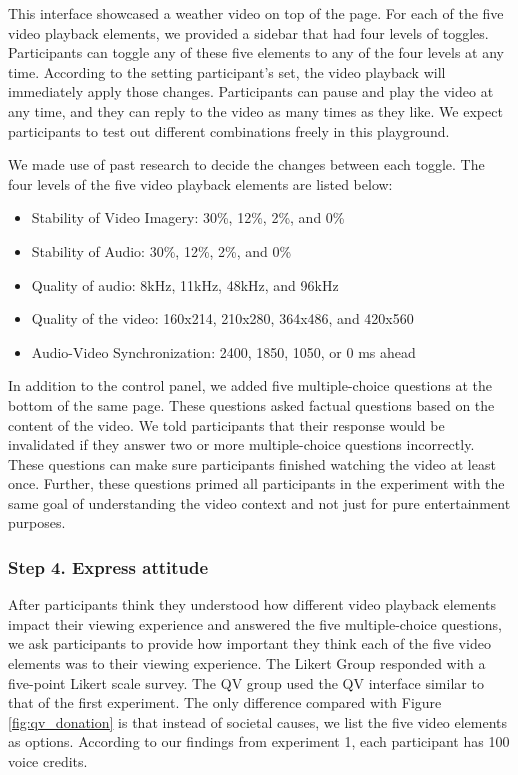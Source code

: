 This interface showcased a weather video on top of the page. For each of the five video playback elements, we provided a sidebar that had four levels of toggles. Participants can toggle any of these five elements to any of the four levels at any time. According to the setting participant's set, the video playback will immediately apply those changes. Participants can pause and play the video at any time, and they can reply to the video as many times as they like. We expect participants to test out different combinations freely in this playground.

We made use of past research to decide the changes between each toggle. The four levels of the five video playback elements are listed below:
\begin{itemize}
    \item Stability of Video Imagery: 30\%, 12\%, 2\%, and 0\%
    \item Stability of Audio: 30\%, 12\%, 2\%, and 0\%
    \item Quality of audio: 8kHz, 11kHz, 48kHz, and 96kHz
    \item Quality of the video: 160x214, 210x280,  364x486, and 420x560 
    \item Audio-Video Synchronization: 2400, 1850,  1050, or 0 ms ahead
\end{itemize}

In addition to the control panel, we added five multiple-choice questions at the bottom of the same page. These questions asked factual questions based on the content of the video. We told participants that their response would be invalidated if they answer two or more multiple-choice questions incorrectly. These questions can make sure participants finished watching the video at least once. Further, these questions primed all participants in the experiment with the same goal of understanding the video context and not just for pure entertainment purposes.

\subsubsection{Step 4. Express attitude}
After participants think they understood how different video playback elements impact their viewing experience and answered the five multiple-choice questions, we ask participants to provide how important they think each of the five video elements was to their viewing experience. The Likert Group responded with a five-point Likert scale survey. The QV group used the QV interface similar to that of the first experiment. The only difference compared with Figure \ref{fig:qv_donation} is that instead of societal causes, we list the five video elements as options. According to our findings from experiment 1, each participant has 100 voice credits.

